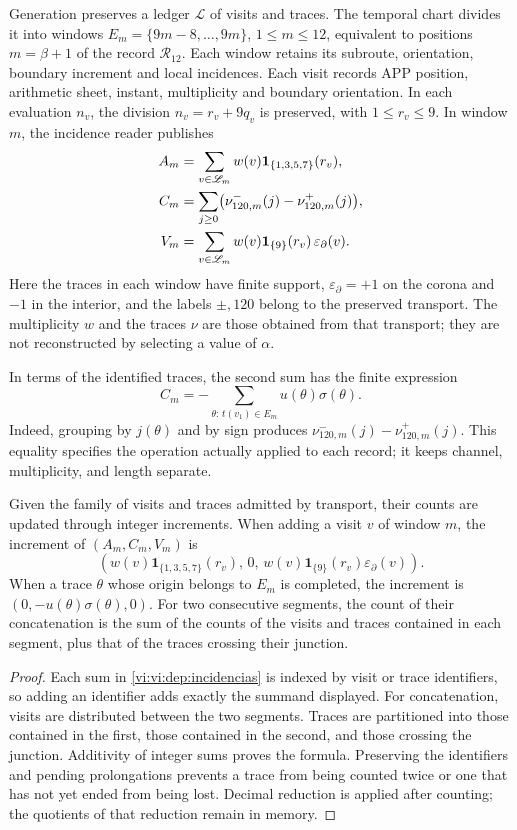 Generation preserves a ledger \(\mathscr L\) of visits and traces.
The temporal chart divides it into windows
\(E_m=\{9m-8,\ldots,9m\}\), \(1\le m\le12\),
equivalent to positions \(m=\beta+1\) of the record
\(\mathcal R_{12}\). Each window retains its subroute,
orientation, boundary increment and local incidences.
Each visit records APP position, arithmetic sheet, instant, multiplicity
and boundary orientation. In each evaluation \(n_v\), the
division \(n_v=r_v+9q_v\) is preserved, with \(1\le r_v\le9\). In window
\(m\), the incidence reader publishes
\begin{align}
 A_m&=\sum_{v\in\mathscr L_m}w(v)
      \mathbf1_{\{1,3,5,7\}}(r_v),\notag\\
 C_m&=\sum_{j\ge0}
       \bigl(\nu^-_{120,m}(j)-\nu^+_{120,m}(j)\bigr),\notag\\
 V_m&=\sum_{v\in\mathscr L_m}w(v)
      \mathbf1_{\{9\}}(r_v)\,\varepsilon_{\partial}(v).
 \label{vi:vi:dep:incidencias}
\end{align}
Here the traces in each window have finite support,
\(\varepsilon_{\partial}=+1\) on the corona and \(-1\) in the interior,
and the labels \(\pm,120\) belong to the preserved transport.
The multiplicity \(w\) and the traces \(\nu\) are those obtained from that
transport; they are not reconstructed by selecting a value of \(\alpha\).

In terms of the identified traces, the second sum has the finite
expression
\[
 C_m=-\sum_{\theta:\,t(v_1)\in E_m}u(\theta)\sigma(\theta).
\]
Indeed, grouping by \(j(\theta)\) and by sign produces
\(\nu^-_{120,m}(j)-\nu^+_{120,m}(j)\). This equality specifies
the operation actually applied to each record; it keeps
channel, multiplicity, and length separate.

\begin{proposition}
\label{vi:vi:dep:libro-actualizacion}
Given the family of visits and traces admitted by transport, their
counts are updated through integer increments. When adding a
visit \(v\) of window \(m\), the increment of \((A_m,C_m,V_m)\) is
\[
 \left(w(v)\mathbf1_{\{1,3,5,7\}}(r_v),\,0,\,
 w(v)\mathbf1_{\{9\}}(r_v)\varepsilon_\partial(v)\right).
\]
When a trace \(\theta\) whose origin belongs to \(E_m\) is completed,
the increment is \((0,-u(\theta)\sigma(\theta),0)\).
For two consecutive segments, the count of their concatenation is
the sum of the counts of the visits and traces contained in each
segment, plus that of the traces crossing their junction.
\end{proposition}
\begin{proof}
Each sum in \eqref{vi:vi:dep:incidencias} is indexed by visit
or trace identifiers, so adding an identifier adds
exactly the summand displayed. For concatenation, visits
are distributed between the two segments. Traces are partitioned into
those contained in the first, those contained in the second, and those
crossing the junction. Additivity of integer sums proves
the formula. Preserving the identifiers and pending
prolongations prevents a trace from being counted twice or one that has
not yet ended from being lost. Decimal reduction is applied after
counting; the quotients of that reduction remain in memory.
\end{proof}

